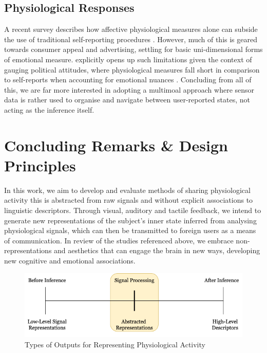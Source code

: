 \subsection{Physiological Responses}
A recent survey describes how affective physiological measures alone can subside the use of traditional self-reporting procedures \cite{barker_self-report_2016}. However, much of this is geared towards consumer appeal and advertising, settling for basic uni-dimensional forms of emotional measure. \citeauthor{ciuk_measuring_2015} explicitly opens up such limitations given the context of gauging political attitudes, where physiological measures fall short in comparison to self-reports when accounting for emotional nuances \cite{ciuk_measuring_2015}. Concluding from all of this, we are far more interested in adopting a multimoal approach where sensor data is rather used to organise and navigate between user-reported states, not acting as the inference itself.


\section{Concluding Remarks \& Design Principles}
\label{lit_review:conclusion}

In this work, we aim to develop and evaluate methods of sharing physiological activity this is abstracted from raw signals and without explicit associations to linguistic descriptors. Through visual, auditory and tactile feedback, we intend to generate new representations of the subject's inner state inferred from analysing physiological signals, which can then be transmitted to foreign users as a means of communication. In review of the studies referenced above, we embrace non-representations and aesthetics that can engage the brain in new ways, developing new cognitive and emotional associations. 

\begin{figure}[htbp]
	\centering
	\includegraphics[width=1.0\textwidth]{Chapters/Figures/Abstracted_Representations.png}
	\caption{Types of Outputs for Representing Physiological Activity}
	\label{fig:Abstracted_Representations}
\end{figure}

